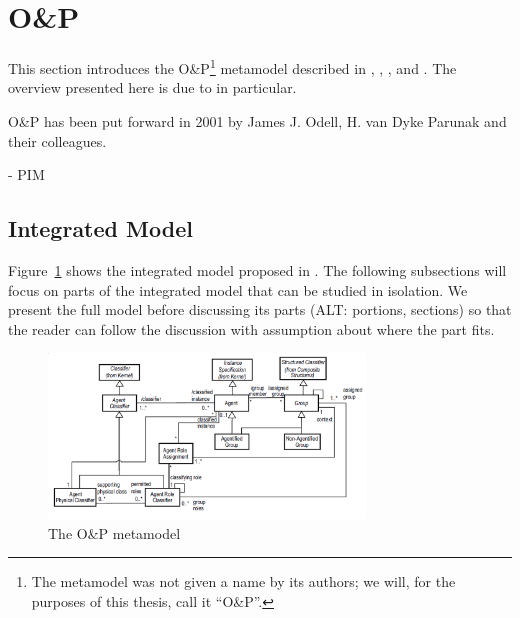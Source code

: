 \section{O\&P}

This section introduces the O\&P\footnote{The metamodel was not given a name by its authors; we will, for the purposes of this thesis, call it ``O\&P''.} metamodel described in \cite{Odell01}, \cite{Parunak02}, \cite{Odell03b}, \cite{Odell04b} and \cite{Odell05}.
The overview presented here is due to \cite{Odell05} in particular.

O\&P has been put forward in 2001 by James J. Odell, H. van Dyke Parunak and their colleagues.


- PIM

\subsection{Integrated Model}

Figure~\ref{figure:onp-metamodel} shows the integrated model proposed in \cite{Odell05}.
The following subsections will focus on parts of the integrated model that can be studied in isolation.
We present the full model before discussing its parts (ALT: portions, sections) so that the reader can follow the discussion with assumption about where the part fits.

\begin{figure}[ht]
	\centering
	\includegraphics[width=0.75\textwidth]{images/onp-metamodel.png}
	\caption{The O\&P metamodel}
	\label{figure:onp-metamodel}
\end{figure}

